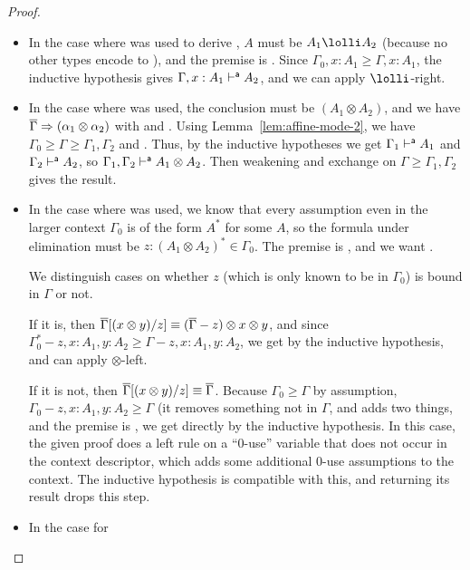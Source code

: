 \begin{proof}
\begin{itemize}
\item In the case where \UR\/ was used to derive
  , $A$ must be $A_1 \lolli A_2$
  (because no other types encode to \Usymb), and the premise is
  .  Since
  ${\Gamma_0,x:A_1} \ge {\Gamma,x:A_1}$, the inductive hypothesis gives
  $\Gamma,x:A_1 \vdash^{\mathsf{a}} A_2$, and we can apply $\lolli$-right.

\item In the case where \FR\/ was used, the conclusion must be $(A_1
  \otimes A_2)$, and we have $\overline{\Gamma} \Rightarrow (\alpha_1 \otimes
  \alpha_2)$ with  and
  .  Using
  Lemma~\ref{lem:affine-mode-2}, we have $\Gamma_0 \ge \Gamma \ge
  \Gamma_1,\Gamma_2$ and 
  .  Thus, by the inductive
  hypotheses we get $\Gamma_1 \vdash^{\mathsf{a}} A_1$ and $\Gamma_2 \vdash^{\mathsf{a}} A_2$,
  so $\Gamma_1,\Gamma_2 \vdash^{\mathsf{a}} A_1 \otimes A_2$.  Then weakening and
  exchange on $\Gamma \ge \Gamma_1,\Gamma_2$ gives the result.  

\item In the case where \FL\/ was used, we know that every assumption even
  in the larger context $\Gamma_0$ is of the form $A^*$ for some $A$, so
  the formula under elimination must be $z:(A_1 \otimes A_2)^* \in \Gamma_0$. The
  premise is
  ,
  and we want 
  .  

  We distinguish cases on whether $z$ (which is only known to be in
  $\Gamma_0$) is bound in $\Gamma$ or not.  

  If it is, then $\overline{\Gamma}[(x \otimes y)/z] \equiv
  (\overline{\Gamma}-z)\otimes x \otimes y$, and since
  $\Gamma_0^*-z,x:A_1,y:A_2 \ge \Gamma-z,x:A_1,y:A_2$, we get
   by the inductive hypothesis, and can
  apply $\otimes$-left.

  If it is not, then $\overline{\Gamma}[(x \otimes y)/z] \equiv
  \overline{\Gamma}$.  Because $\Gamma_0 \ge \Gamma$ by assumption,
  ${\Gamma_0-z,x:A_1,y:A_2} \ge \Gamma$ (it removes something not in
  $\Gamma$, and adds two things, and the premise is 
  ,
  we get  directly by the inductive hypothesis.  
  In this case, the given proof does a left rule on a ``0-use''
  variable that does not occur in the context descriptor, which adds
  some additional 0-use assumptions to the context.  The inductive
  hypothesis is compatible with this, and returning its result
  drops this step.    

\item In the case for \UL 

\end{itemize}
\end{proof}
